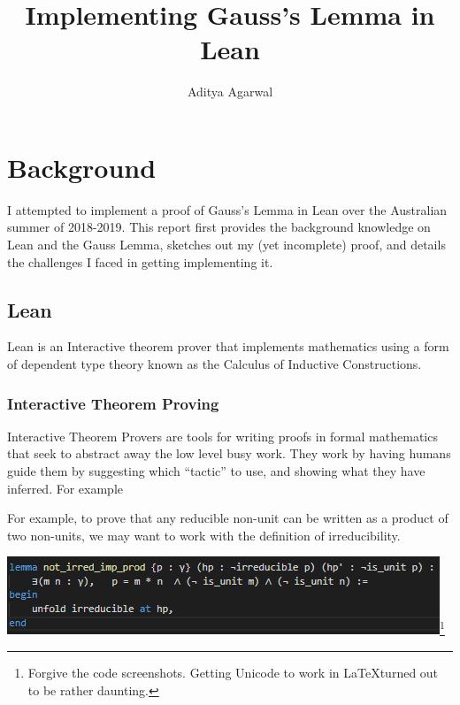 \documentclass[pagesize=a4]{scrreprt}
\title{Implementing Gauss's Lemma in Lean}
\author{Aditya Agarwal}
\begin{document}
\maketitle

\chapter{Background}

I attempted to implement a proof of Gauss's Lemma in Lean over the Australian summer of 2018-2019. This report first provides the background knowledge on Lean and the Gauss Lemma, sketches out my (yet incomplete) proof, and details the challenges I faced in getting implementing it.  

\section{Lean}

Lean is an Interactive theorem prover that implements mathematics using a form of dependent type theory known as the Calculus of Inductive Constructions. 

\subsection{Interactive Theorem Proving}

Interactive Theorem Provers are tools for writing proofs in formal mathematics that seek to abstract away the low level busy work. They work by having humans guide them by suggesting which ``tactic'' to use, and showing what they have inferred. For example 

For example, to prove that any reducible non-unit can be written as a product of two non-units, we may want to work with the definition of irreducibility. 

\smallskip

\begin{center}

\includegraphics{tactic_example.png}\footnote{Forgive the code screenshots. Getting Unicode to work in \LaTeX turned out to be rather daunting. }

\end{center}
\smallskip
\end{document}
